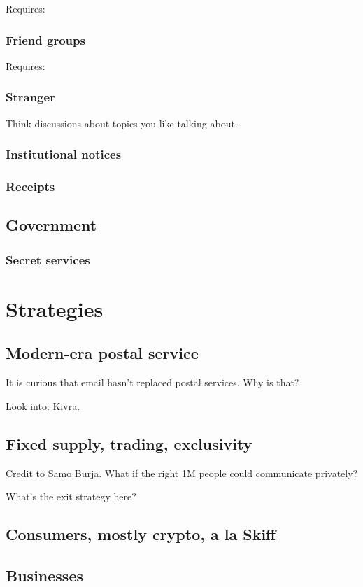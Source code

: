 \documentclass[sigconf, nonacm, balance=false, natbib=false]{acmart}
\begin{document}
Requires:

\subsubsection{Friend groups}

Requires:

\subsubsection{Stranger}

Think discussions about topics you like talking about.

\subsubsection{Institutional notices} %

\subsubsection{Receipts}

\subsection{Government}

\subsubsection{Secret services}

\section{Strategies}

\subsection{Modern-era postal service}

It is curious that email hasn't replaced postal services. Why is that?

Look into: Kivra.

\subsection{Fixed supply, trading, exclusivity}

Credit to Samo Burja. What if the right 1M people could communicate privately?

What's the exit strategy here?

\subsection{Consumers, mostly crypto, a la Skiff}

\subsection{Businesses}

\printbibliography
\end{document}

